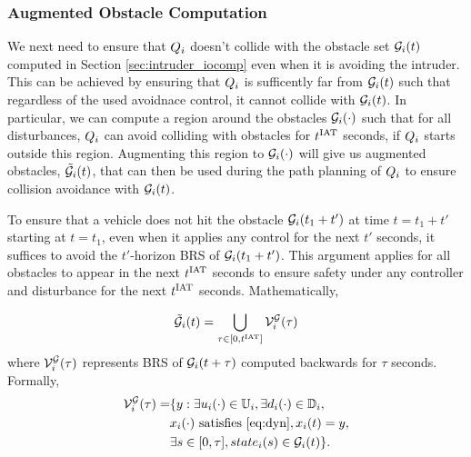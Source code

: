 \subsubsection{Augmented Obstacle Computation \label{sec:intruder_aocomp}}
We next need to ensure that $Q_i$ doesn't collide with the obstacle set $\mathcal{G}_i(t)$ computed in Section \ref{sec:intruder_iocomp} even when it is avoiding the intruder. This can be achieved by ensuring that $Q_i$ is sufficently far from $\mathcal{G}_i(t)$ such that regardless of the used avoidnace control, it cannot collide with $\mathcal{G}_i(t)$. In particular, we can compute a region around the obstacles $\mathcal{G}_i(\cdot)$ such that for all disturbances, $Q_i$ can avoid colliding with obstacles for $t^\text{IAT}$ seconds, if $Q_i$ starts outside this region. Augmenting this region to $\mathcal{G}_i(\cdot)$ will give us augmented obstacles, $\tilde{\mathcal{G}}_i(t)$, that can then be used during the path planning of $Q_i$ to ensure collision avoidance with $\mathcal{G}_i(t)$.  

To ensure that a vehicle does not hit the obstacle $\mathcal{G}_i(t_1 + t')$ at time $t = t_1 + t'$ starting at $t = t_1$, even when it applies any control for the next $t'$ seconds, it suffices to avoid the $t'$-horizon BRS of $\mathcal{G}_i(t_1 + t')$. This argument applies for all obstacles to appear in the next $t^\text{IAT}$ seconds to ensure safety under any controller and disturbance for the next $t^\text{IAT}$ seconds. Mathematically,

\begin{equation} \label{eqn:inducedobs}
\tilde\obsset_i(t) = \bigcup_{\tau \in [0, \iat]} \brs^{\mathcal{G}}_{i}(\tau)
\end{equation}
where $\mathcal{V}^{\mathcal{G}}_{i}(\tau)$ represents BRS of $\mathcal{G}_i(t+\tau)$ computed backwards for $\tau$ seconds. Formally, 
\begin{equation} \label{eqn:inducedobs_help1}
\begin{aligned}
\brs^{\mathcal{G}}_{i}(\tau) = & \{y: \exists \ctrl_i(\cdot) \in \cfset_i, \exists \dstb_i(\cdot) \in \dfset_i, \\
& \state_i(\cdot) \text{ satisfies \eqref{eq:dyn}}, \state_i(t) = y, \\
& \exists s \in [0, \tau], state_i(s) \in \obsset_i(t)\}.
\end{aligned}
\end{equation}

